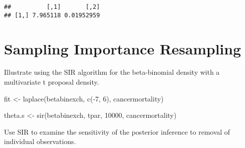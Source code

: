 \documentclass[
]{book}
\newenvironment{Shaded}{\begin{snugshade}}{\end{snugshade}}
\newcommand{\AttributeTok}[1]{\textcolor[rgb]{0.77,0.63,0.00}{#1}}
\newcommand{\DecValTok}[1]{\textcolor[rgb]{0.00,0.00,0.81}{#1}}
\newcommand{\FunctionTok}[1]{\textcolor[rgb]{0.00,0.00,0.00}{#1}}
\newcommand{\NormalTok}[1]{#1}
\newcommand{\OtherTok}[1]{\textcolor[rgb]{0.56,0.35,0.01}{#1}}
\newcommand{\SpecialCharTok}[1]{\textcolor[rgb]{0.00,0.00,0.00}{#1}}
\begin{document}
\begin{verbatim}
##          [,1]       [,2]
## [1,] 7.965118 0.01952959
\end{verbatim}

\hypertarget{sampling-importance-resampling}{%
\section{Sampling Importance Resampling}\label{sampling-importance-resampling}}

Illustrate using the SIR algorithm for the beta-binomial density with a multivariate t proposal density.

\begin{Shaded}
\begin{Highlighting}[]
\NormalTok{fit }\OtherTok{\textless{}{-}} \FunctionTok{laplace}\NormalTok{(betabinexch, }
               \FunctionTok{c}\NormalTok{(}\SpecialCharTok{{-}}\DecValTok{7}\NormalTok{, }\DecValTok{6}\NormalTok{), }
\NormalTok{               cancermortality)}
\end{Highlighting}
\end{Shaded}

\begin{Shaded}
\end{Shaded}

\begin{Shaded}
\begin{Highlighting}[]
\NormalTok{theta.s }\OtherTok{\textless{}{-}} \FunctionTok{sir}\NormalTok{(betabinexch, }
\NormalTok{               tpar, }\DecValTok{10000}\NormalTok{, }
\NormalTok{               cancermortality)}
\end{Highlighting}
\end{Shaded}

Use SIR to examine the sensitivity of the posterior inference to removal of individual observations.
\end{document}
